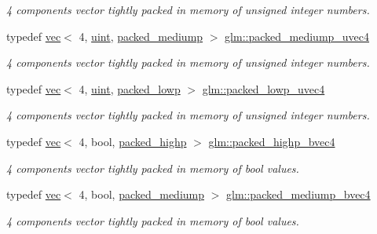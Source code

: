 \begin{DoxyCompactItemize}
\begin{DoxyCompactList}\small\item\em 4 components vector tightly packed in memory of unsigned integer numbers. \end{DoxyCompactList}\item 
typedef \hyperlink{structglm_1_1vec}{vec}$<$ 4, \hyperlink{group__core__precision_ga4fd29415871152bfb5abd588334147c8}{uint}, \hyperlink{namespaceglm_a36ed105b07c7746804d7fdc7cc90ff25a9604654c3b137cd7898689fd34b25bc0}{packed\+\_\+mediump} $>$ \hyperlink{group__gtc__type__aligned_ga228b9899ea277eb8655d01c754e1ee64}{glm\+::packed\+\_\+mediump\+\_\+uvec4}
\begin{DoxyCompactList}\small\item\em 4 components vector tightly packed in memory of unsigned integer numbers. \end{DoxyCompactList}\item 
typedef \hyperlink{structglm_1_1vec}{vec}$<$ 4, \hyperlink{group__core__precision_ga4fd29415871152bfb5abd588334147c8}{uint}, \hyperlink{namespaceglm_a36ed105b07c7746804d7fdc7cc90ff25ac36a4bd74559be2c0b65bc48e5953b8b}{packed\+\_\+lowp} $>$ \hyperlink{group__gtc__type__aligned_gaddae01027a0dc8e3d953a3ca68b5a0cd}{glm\+::packed\+\_\+lowp\+\_\+uvec4}
\begin{DoxyCompactList}\small\item\em 4 components vector tightly packed in memory of unsigned integer numbers. \end{DoxyCompactList}\item 
typedef \hyperlink{structglm_1_1vec}{vec}$<$ 4, bool, \hyperlink{namespaceglm_a36ed105b07c7746804d7fdc7cc90ff25a8e8791ee77fe079b1291f710d88031bf}{packed\+\_\+highp} $>$ \hyperlink{group__gtc__type__aligned_gaa7a006e26052e668a16bf3b8bd81cbef}{glm\+::packed\+\_\+highp\+\_\+bvec4}
\begin{DoxyCompactList}\small\item\em 4 components vector tightly packed in memory of bool values. \end{DoxyCompactList}\item 
typedef \hyperlink{structglm_1_1vec}{vec}$<$ 4, bool, \hyperlink{namespaceglm_a36ed105b07c7746804d7fdc7cc90ff25a9604654c3b137cd7898689fd34b25bc0}{packed\+\_\+mediump} $>$ \hyperlink{group__gtc__type__aligned_gad50db2a2ae76ec64785b9d87cd2dfb2c}{glm\+::packed\+\_\+mediump\+\_\+bvec4}
\begin{DoxyCompactList}\small\item\em 4 components vector tightly packed in memory of bool values. \end{DoxyCompactList}\item 

\end{DoxyCompactItemize}
